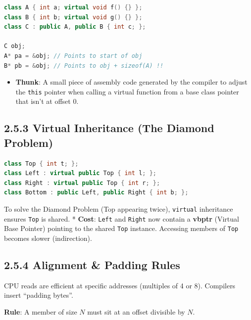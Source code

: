 \begin{lstlisting}[language={C++}]
class A { int a; virtual void f() {} };
class B { int b; virtual void g() {} };
class C : public A, public B { int c; };

C obj;
A* pa = &obj; // Points to start of obj
B* pb = &obj; // Points to obj + sizeof(A) !!
\end{lstlisting}

\begin{itemize}
\tightlist
\item
  \textbf{Thunk}: A small piece of assembly code generated by the
  compiler to adjust the \passthrough{\lstinline!this!} pointer when
  calling a virtual function from a base class pointer that isn't at
  offset 0.
\end{itemize}

\hypertarget{virtual-inheritance-the-diamond-problem}{%
\subsection{2.5.3 Virtual Inheritance (The Diamond
Problem)}\label{virtual-inheritance-the-diamond-problem}}

\begin{lstlisting}[language={C++}]
class Top { int t; };
class Left : virtual public Top { int l; };
class Right : virtual public Top { int r; };
class Bottom : public Left, public Right { int b; };
\end{lstlisting}

To solve the Diamond Problem (Top appearing twice),
\passthrough{\lstinline!virtual!} inheritance ensures
\passthrough{\lstinline!Top!} is shared. * \textbf{Cost}:
\passthrough{\lstinline!Left!} and \passthrough{\lstinline!Right!} now
contain a \textbf{vbptr} (Virtual Base Pointer) pointing to the shared
\passthrough{\lstinline!Top!} instance. Accessing members of
\passthrough{\lstinline!Top!} becomes slower (indirection).

\hypertarget{alignment-padding-rules}{%
\subsection{2.5.4 Alignment \& Padding
Rules}\label{alignment-padding-rules}}

CPU reads are efficient at specific addresses (multiples of 4 or 8).
Compilers insert ``padding bytes''.

\textbf{Rule}: A member of size \(N\) must sit at an offset divisible by
\(N\).

